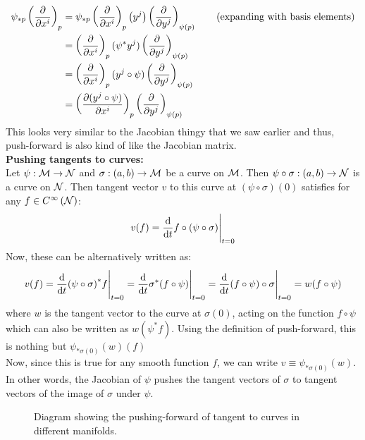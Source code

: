 \begin{align*}
  \psi_{*p}\left( \pdv{x^i} \right)_p &=  \psi_{*p}\left( \pdv{x^i} \right)_p\left( y^j \right)\left( \pdv{y^j} \right)_{\psi(p)}\quad\quad \text{(expanding with basis elements)}\\
  &=\left( \pdv{x^i} \right)_p(\psi^* y^j)\left( \pdv{y^j} \right)_{\psi(p)}\\
  &=\left( \pdv{x^i} \right)_p(y^j\circ \psi)\left( \pdv{y^j} \right)_{\psi(p)}\\
  &=\left( \pdv{(y^j\circ \psi)}{x^i} \right)_p\left( \pdv{y^j} \right)_{\psi(p)}
\end{align*}  
This looks very similar to the Jacobian thingy that we saw earlier and thus, push-forward is also kind of like the Jacobian matrix.\\[0.3cm]
\textbf{Pushing tangents to curves:}\\[0.2cm]
Let $\psi: \mathcal M\rightarrow \mathcal N$ and $\sigma: (a,b)\rightarrow \mathcal M$ be a curve on $\mathcal M$. Then $\psi\circ \sigma: (a,b)\rightarrow \mathcal N$ is a curve on $\mathcal N$. Then tangent vector $v$ to this curve at $(\psi\circ \sigma)(0)$ satisfies for any $f\in C^{\infty}\left(\mathcal N\right)$: 
$$v(f) = \dv{t}f\circ (\psi\circ \sigma)\Bigg|_{t=0}$$
Now, these can be alternatively written as: 
$$v(f) = \dv{t} (\psi\circ \sigma)^* f\Bigg|_{t=0} = \dv{t}\sigma^*(f\circ \psi)\Bigg|_{t=0} =\dv{t}(f\circ \psi)\circ \sigma\Bigg|_{t=0} = w(f\circ\psi)$$
where $w$ is the tangent vector to the curve at $\sigma(0)$, acting on the function $f\circ\psi$ which can also be written as $w(\psi^*f)$. Using the definition of push-forward, this is nothing but $\psi_{*\sigma(0)}(w)(f)$\\
Now, since this is true for any smooth function $f$, we can write $v\equiv \psi_{*\sigma(0)}(w)$. In other words, the Jacobian of $\psi$ pushes the tangent vectors of $\sigma$ to tangent vectors of the image of $\sigma$ under $\psi$. 
\begin{figure}[H]
  \centering
  
  \caption{Diagram showing the pushing-forward of tangent to curves in different manifolds.}
\end{figure}

